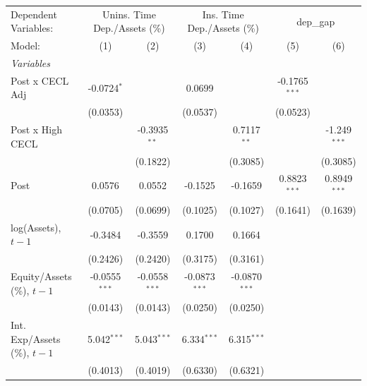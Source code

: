 
\begingroup
\centering
\begin{tabular}{lcccccc}
   \tabularnewline \midrule \midrule
   Dependent Variables: & \multicolumn{2}{c}{Unins. Time Dep./Assets (\%)} & \multicolumn{2}{c}{Ins. Time Dep./Assets (\%)} & \multicolumn{2}{c}{dep\_gap}\\
   Model:                         & (1)             & (2)             & (3)             & (4)             & (5)             & (6)\\  
   \midrule
   \emph{Variables}\\
   Post x CECL Adj                & -0.0724$^{*}$   &                 & 0.0699          &                 & -0.1765$^{***}$ &   \\   
                                  & (0.0353)        &                 & (0.0537)        &                 & (0.0523)        &   \\   
   Post x High CECL               &                 & -0.3935$^{**}$  &                 & 0.7117$^{**}$   &                 & -1.249$^{***}$\\   
                                  &                 & (0.1822)        &                 & (0.3085)        &                 & (0.3085)\\   
   Post                           & 0.0576          & 0.0552          & -0.1525         & -0.1659         & 0.8823$^{***}$  & 0.8949$^{***}$\\   
                                  & (0.0705)        & (0.0699)        & (0.1025)        & (0.1027)        & (0.1641)        & (0.1639)\\   
   log(Assets), $t{-}1$           & -0.3484         & -0.3559         & 0.1700          & 0.1664          &                 &   \\   
                                  & (0.2426)        & (0.2420)        & (0.3175)        & (0.3161)        &                 &   \\   
   Equity/Assets (\%), $t{-}1$    & -0.0555$^{***}$ & -0.0558$^{***}$ & -0.0873$^{***}$ & -0.0870$^{***}$ &                 &   \\   
                                  & (0.0143)        & (0.0143)        & (0.0250)        & (0.0250)        &                 &   \\   
   Int. Exp/Assets (\%), $t{-}1$  & 5.042$^{***}$   & 5.043$^{***}$   & 6.334$^{***}$   & 6.315$^{***}$   &                 &   \\   
                                  & (0.4013)        & (0.4019)        & (0.6330)        & (0.6321)        &                 &   \\   

\end{tabular}
